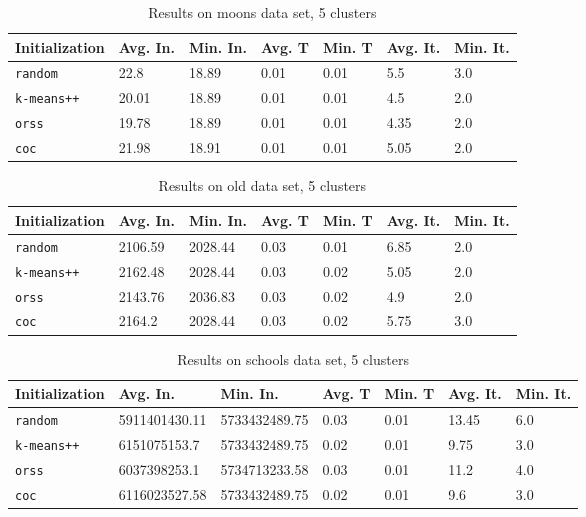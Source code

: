 \documentclass[twoside, 11pt]{article}
\begin{document}
		\begin{table}[p]
			\begin{center}
				\begin{tabular}{|l|l|l|l|l|l|l|}
					\hline
					Initialization & Avg. In. & Min. In. & Avg. T & Min. T & Avg. It. & Min. It.\\\hline
					\texttt{random} & 22.8 & 18.89 & 0.01 & 0.01 & 5.5 & 3.0\\\hline
					\texttt{k-means++} & 20.01 & 18.89 & 0.01 & 0.01 & 4.5 & 2.0\\\hline
					\texttt{orss} & 19.78 & 18.89 & 0.01 & 0.01 & 4.35 & 2.0\\\hline
					\texttt{coc} & 21.98 & 18.91 & 0.01 & 0.01 & 5.05 & 2.0\\\hline
				\end{tabular}
				\caption{Results on moons data set, 5 clusters}
				\label{tbl:moons5}
			\end{center}
		\end{table}
		
		\begin{table}[p]
			\begin{center}
				\begin{tabular}{|l|l|l|l|l|l|l|}
					\hline
					Initialization & Avg. In. & Min. In. & Avg. T & Min. T & Avg. It. & Min. It.\\\hline
					\texttt{random} & 2106.59 & 2028.44 & 0.03 & 0.01 & 6.85 & 2.0\\\hline
					\texttt{k-means++} & 2162.48 & 2028.44 & 0.03 & 0.02 & 5.05 & 2.0\\\hline
					\texttt{orss} & 2143.76 & 2036.83 & 0.03 & 0.02 & 4.9 & 2.0\\\hline
					\texttt{coc} & 2164.2 & 2028.44 & 0.03 & 0.02 & 5.75 & 3.0\\\hline
				\end{tabular}
				\caption{Results on old data set, 5 clusters}
				\label{tbl:old5}
			\end{center}
		\end{table}
		
		\begin{table}[p]
			\begin{center}
				\begin{tabular}{|l|l|l|l|l|l|l|}
					\hline
					Initialization & Avg. In. & Min. In. & Avg. T & Min. T & Avg. It. & Min. It.\\\hline
					\texttt{random} & 5911401430.11 & 5733432489.75 & 0.03 & 0.01 & 13.45 & 6.0\\\hline
					\texttt{k-means++} & 6151075153.7 & 5733432489.75 & 0.02 & 0.01 & 9.75 & 3.0\\\hline
					\texttt{orss} & 6037398253.1 & 5734713233.58 & 0.03 & 0.01 & 11.2 & 4.0\\\hline
					\texttt{coc} & 6116023527.58 & 5733432489.75 & 0.02 & 0.01 & 9.6 & 3.0\\\hline
				\end{tabular}
				\caption{Results on schools data set, 5 clusters}
				\label{tbl:schools5}
			\end{center}
		\end{table}
		
\end{document}

